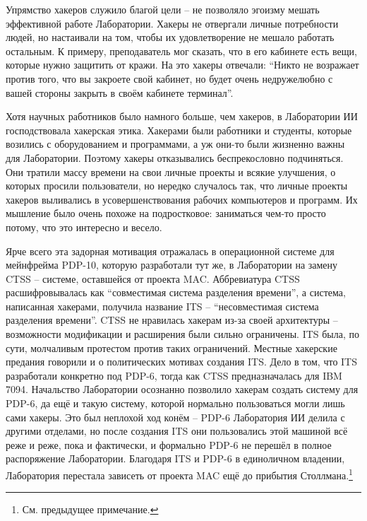 Упрямство хакеров служило благой цели -- не позволяло эгоизму мешать эффективной работе Лаборатории. Хакеры не отвергали личные потребности людей, но настаивали на том, чтобы их удовлетворение не мешало работать остальным. К примеру, преподаватель мог сказать, что в его кабинете есть вещи, которые нужно защитить от кражи. На это хакеры отвечали: \enquote{Никто не возражает против того, что вы закроете свой кабинет, но будет очень недружелюбно с вашей стороны закрыть в своём кабинете терминал}.

Хотя научных работников было намного больше, чем хакеров, в Лаборатории ИИ господствовала хакерская этика. Хакерами были работники и студенты, которые возились с оборудованием и программами, а уж они-то были жизненно важны для Лаборатории. Поэтому хакеры отказывались беспрекословно подчиняться. Они тратили массу времени на свои личные проекты и всякие улучшения, о которых просили пользователи, но нередко случалось так, что личные проекты хакеров выливались в усовершенствования рабочих компьютеров и программ. Их мышление было очень похоже на подростковое: заниматься чем-то просто потому, что это интересно и весело.

Ярче всего эта задорная мотивация отражалась в операционной системе для мейнфрейма PDP-10, которую разработали тут же, в Лаборатории на замену CTSS -- системе, оставшейся от проекта MAC. Аббревиатура CTSS расшифровывалась как \enquote{совместимая система разделения времени}, а система, написанная хакерами, получила название ITS -- \enquote{несовместимая система разделения времени}. CTSS не нравилась хакерам из-за своей архитектуры -- возможности модификации и расширения были сильно ограничены. ITS была, по сути, молчаливым протестом против таких ограничений. Местные хакерские предания говорили и о политических мотивах создания ITS. Дело в том, что ITS разработали конкретно под PDP-6, тогда как CTSS предназначалась для IBM 7094. Начальство Лаборатории осознанно позволило хакерам создать систему для PDP-6, да ещё и такую систему, которой нормально пользоваться могли лишь сами хакеры. Это был неплохой ход конём -- PDP-6 Лаборатория ИИ делила с другими отделами, но после создания ITS они пользовались этой машиной всё реже и реже, пока и фактически, и формально PDP-6 не перешёл в полное распоряжение Лаборатории. Благодаря ITS и PDP-6 в единоличном владении, Лаборатория перестала зависеть от проекта MAC ещё до прибытия Столлмана.\footnote{См. предыдущее примечание.}

